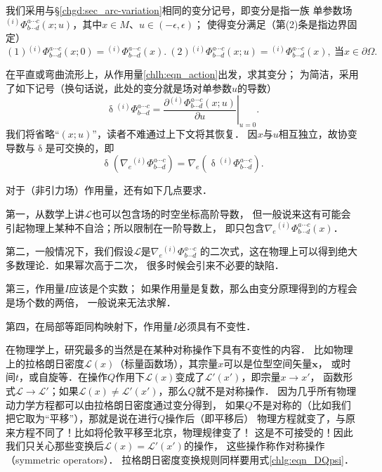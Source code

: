 我们采用与\S\ref{chgd:sec_arc-variation}相同的变分记号，即变分是指一族
单参数场${}^{(i)}\Phi^{a\cdots c}_{b\cdots d}(x;u)$，其中$x\in M$、$ u\in (-\epsilon,\epsilon)$；
使得变分满足（第(2)条是指边界固定）
\setlength{\mathindent}{0em}
\begin{equation}\label{chlh:eqn_fvonboud}
    (1) {}^{(i)}\Phi^{a\cdots c}_{b\cdots d}(x;0) = {}^{(i)}\Phi^{a\cdots c}_{b\cdots d}(x). \
    (2) {}^{(i)}\Phi^{a\cdots c}_{b\cdots d}(x;u) = {}^{(i)}\Phi^{a\cdots c}_{b\cdots d}(x), \
    \text{当} x \in \partial \Omega.
\end{equation}\setlength{\mathindent}{2em}

在平直或弯曲流形上，从作用量\eqref{chlh:eqn_action}出发，求其变分；
为简洁，采用了如下记号（换句话说，此处的变分就是场对单参数$u$的导数）
\begin{equation} \label{chlh:eqn_updelta-Phi}
    \updelta {}^{(i)}\Phi^{a\cdots c}_{b\cdots d} =
    \left.\frac{\partial {}^{(i)}\Phi^{a\cdots c}_{b\cdots d}(x;u)}
    {\partial u}\right|_{u=0} .
\end{equation}
我们将省略“$(x;u)$”，读者不难通过上下文将其恢复．
因$x$与$u$相互独立，故协变导数与$\updelta$是可交换的，即
\begin{equation}\label{chlh:eqn_DppD}
    \updelta \left( \nabla_e {}^{(i)}\Phi^{a\cdots c}_{b\cdots d}\right) =
    \nabla_e \left( \updelta {}^{(i)}\Phi^{a\cdots c}_{b\cdots d}\right) .
\end{equation}



对于（非引力场）作用量，还有如下几点要求．

第一，从数学上讲$\mathscr{L}$也可以包含场的时空坐标高阶导数，
但一般说来这有可能会引起物理上某种不自洽；所以限制在一阶导数上，
即只包含$\nabla_{e}{}^{(i)}\Phi^{a\cdots c}_{b\cdots d}(x)$．

第二，一般情况下，我们假设$\mathscr{L}$是$\nabla_{e}{}^{(i)}\Phi^{a\cdots c}_{b\cdots d}$
的二次式，这在物理上可以得到绝大多数理论．如果幂次高于二次，
很多时候会引来不必要的缺陷．

第三，作用量$I$应该是个实数；
如果作用量是复数，那么由变分原理得到的方程会是场个数的两倍，
一般说来无法求解．

第四，在局部等距同构映射下，作用量$I$必须具有不变性．


在物理学上，研究最多的当然是在某种对称操作下具有不变性的内容．
比如物理上的拉格朗日密度$\mathscr{L}(x)$（标量函数场），其宗量$x$可以是位型空间矢量$\boldsymbol{x}$，
或时间$t$，或自旋等．在操作$Q$作用下$\mathscr{L}(x)$变成了$\mathscr{L}'(x')$，即宗量$x\to x'$，
函数形式$\mathscr{L}\to \mathscr{L}'$；如果$\mathscr{L}(x)\neq \mathscr{L}'(x')$，那么$Q$就不是对称操作．
因为几乎所有物理动力学方程都可以由拉格朗日密度通过变分得到，
如果$Q$不是对称的（比如我们把它取为“平移”），那就是说在进行$Q$操作后（即平移后）
物理方程就变了，与原来方程不同了！比如将伦敦平移至北京，物理规律变了！
这是不可接受的！因此我们只关心那些变换后$\mathscr{L}(x)= \mathscr{L}'(x')$的操作，
这些操作称作{\heiti 对称操作}（symmetric operators）．
拉格朗日密度变换规则同样要用式\eqref{chlg:eqn_DQpsi}．

